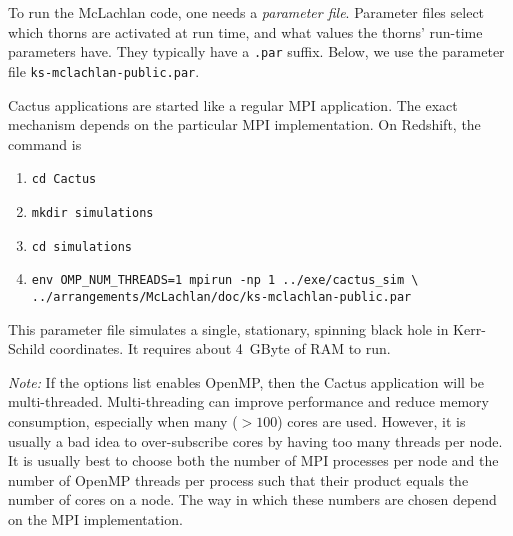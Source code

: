 \documentclass[11pt, tightenlines]{revtex4}
\newcommand{\code}[1]{\texttt{#1}}
\begin{document}
To run the McLachlan code, one needs a \emph{parameter file}.
Parameter files select which thorns are activated at run time, and
what values the thorns' run-time parameters have.  They typically have
a \code{.par} suffix.  Below, we use the parameter file
\code{ks-mclachlan-public.par}.

Cactus applications are started like a regular MPI application.  The
exact mechanism depends on the particular MPI implementation.  On
Redshift, the command is
\begin{enumerate}
\item\verb+cd Cactus+
\item\verb+mkdir simulations+
\item\verb+cd simulations+
\item\verb+env OMP_NUM_THREADS=1 mpirun -np 1 ../exe/cactus_sim \+
\verb+   ../arrangements/McLachlan/doc/ks-mclachlan-public.par+
\end{enumerate}
This parameter file simulates a single, stationary, spinning black
hole in Kerr-Schild coordinates.  It requires about 4~GByte of RAM to
run.

\emph{Note:} If the options list enables OpenMP, then the Cactus
application will be multi-threaded.  Multi-threading can improve
performance and reduce memory consumption, especially when many
($>100$) cores are used.  However, it is usually a bad idea to
over-subscribe cores by having too many threads per node.  It is
usually best to choose both the number of MPI processes per node and
the number of OpenMP threads per process such that their product
equals the number of cores on a node.  The way in which these numbers
are chosen depend on the MPI implementation.





\end{document}
